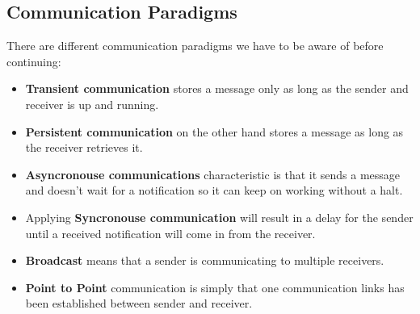 \documentclass[a4paper,titlepage,11pt,DIV10,BCOR0.5cm,headinclude]{article}
\begin{document}
\subsection{Communication Paradigms}
There are different communication paradigms we have to be aware of before continuing:
\begin{itemize}
	\item \textbf{Transient communication} stores a message only as long as the sender and receiver is up and running.  
	\item \textbf{Persistent communication} on the other hand stores a message as long as the receiver retrieves it.
	\item \textbf{Asyncronouse communications} characteristic is that it sends a message and doesn't wait for a notification so it can keep on working without a halt.
	\item Applying \textbf{Syncronouse communication} will result in a delay for the sender until a received notification will come in from the receiver. 
	\item \textbf{Broadcast} means that a sender is communicating to multiple receivers.
	\item \textbf{Point to Point} communication is simply that one communication links has been established between sender and receiver.
\end{itemize}
\end{document}
